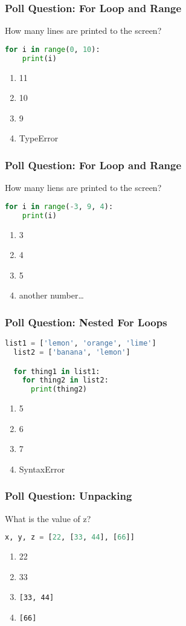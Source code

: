 \documentclass{beamer}
\begin{document}
%
%
\begin{frame}[fragile]
  \frametitle{Poll Question: For Loop and Range}
  How many lines are printed to the screen?
  \begin{lstlisting}[language=Python, autogobble]
  for i in range(0, 10):
    print(i)
  \end{lstlisting}
  \vfill
  \begin{enumerate}[A]
    \item 11
    \item 10
    \item 9
    \item TypeError
  \end{enumerate}
\end{frame}

%
%
\begin{frame}[fragile]
  \frametitle{Poll Question: For Loop and Range}
  How many liens are printed to the screen?
  \begin{lstlisting}[language=Python, autogobble]
  for i in range(-3, 9, 4):
    print(i)
  \end{lstlisting}
  \vfill
  \begin{enumerate}[A]
    \item 3
    \item 4
    \item 5
    \item another number\dots
  \end{enumerate}
\end{frame}

%
%
\begin{frame}[fragile]
  \frametitle{Poll Question: Nested For Loops}

  \begin{lstlisting}[language=Python, autogobble]
  list1 = ['lemon', 'orange', 'lime']
  list2 = ['banana', 'lemon']

  for thing1 in list1:
    for thing2 in list2:
      print(thing2)
  \end{lstlisting}
  \vfill
  \begin{enumerate}[A]
    \item 5
    \item 6
    \item 7
    \item SyntaxError
  \end{enumerate}
\end{frame}

%
%
\begin{frame}[fragile]
  \frametitle{Poll Question: Unpacking}
  What is the value of z?
  \begin{lstlisting}[language=Python, autogobble]
  x, y, z = [22, [33, 44], [66]]
  \end{lstlisting}
  \vfill
  \begin{enumerate}[A]
    \item 22
    \item 33
    \item \lstinline|[33, 44]|
    \item \lstinline|[66]|
  \end{enumerate}
\end{frame}
\end{document}
